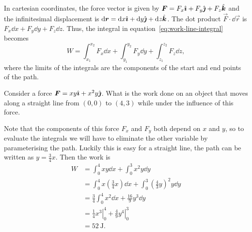 \documentclass[../classical_mechanics.tex]{subfiles}
\begin{document}
        In cartesian coordinates, the force vector is given by $\boldsymbol{F}=F_x\hat{\boldsymbol{\imath}}+F_y\hat{\boldsymbol{\jmath}}+F_z\hat{\boldsymbol{k}}$ and the infinitesimal displacement is $\dd{\vec{r}}=\dd{x}\ihat+\dd{y}\jhat+\dd{z}\khat$.
        The dot product $\vec{F}\cdot\dd{\vec{r}}$ is $F_x\dd{x}+F_y\dd{y}+F_z\dd{z}$.
        Thus, the integral in equation~\ref{eq:work-line-integral} becomes
        \begin{equation}
            W=\int_{x_1}^{x_2}F_x\dd{x}+\int_{y_1}^{y_2}F_y\dd{y}+\int_{z_1}^{z_2}F_z\dd{z},
        \end{equation}
        where the limits of the integrals are the components of the start and end points of the path.
        \begin{example}\label{ex:work-cartesian}
            Consider a force $\boldsymbol{F}=xy\hat{\boldsymbol{\imath}}+x^2y\hat{\boldsymbol{\jmath}}$.
            What is the work done on an object that moves along a straight line from $(0,0)$ to $(4,3)$ while under the influence of this force.

            Note that the components of this force $F_x$ and $F_y$ both depend on $x$ and $y$, so to evaluate the integrals we will have to eliminate the other variable by parameterising the path.
            Luckily this is easy for a straight line, the path can be written as $y=\frac{3}{4}x$.
            Then the work is
            \begin{align}
                W&=\int_0^4 xy\dd{x}+\int_0^3x^2y\dd{y}\\
                &=\int_0^4 x\left(\frac{3}{4}x\right)\dd{x}+\int_0^3\left(\frac{4}{3}y\right)^2y\dd{y}\\
                &=\frac{3}{4}\int_0^4x^2\dd{x}+\frac{16}{9}y^3\dd{y}\\
                &=\left.\frac{1}{4}x^3\right|_0^4+\left.\frac{4}{9}y^4\right|_0^3\\
                &=\qty{52}{\joule}.
            \end{align}
        \end{example}
        
\end{document}
